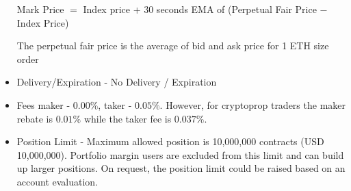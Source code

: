 \begin{itemize}
Mark Price $=$ Index price + 30 seconds EMA of (Perpetual Fair Price $-$ Index Price)


The perpetual fair price is the average of bid and ask price for 1 ETH size order
 
\item Delivery/Expiration - No Delivery / Expiration
 
\item Fees maker - $0.00\%$, taker - $0.05\%$. However, for cryptoprop traders the maker rebate is $0.01 \%$ while the taker fee is $0.037\%$.
 
\item Position Limit - Maximum allowed position is 10,000,000 contracts (USD 10,000,000). Portfolio margin users are excluded from this limit and can build up larger positions. On request, the position limit could be raised based on an account evaluation.
 
\end{itemize} 
